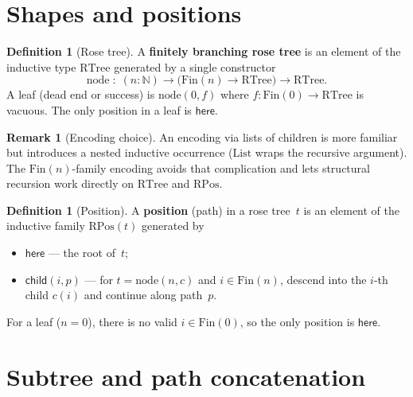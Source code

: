 \documentclass[11pt,a4paper]{article}
\theoremstyle{plain}
\theoremstyle{definition}
\newtheorem{definition}[theorem]{Definition}
\newtheorem{remark}[theorem]{Remark}
\newcommand{\RTree}{\mathrm{RTree}}
\newcommand{\RPos}{\mathrm{RPos}}
\newcommand{\Fin}{\mathrm{Fin}}
\begin{document}
\section{Shapes and positions}

\begin{definition}[Rose tree]\label{def:rtree}
A \textbf{finitely branching rose tree} is an element of the inductive
type $\RTree$ generated by a single constructor
\begin{equation}
  \mathrm{node} \;:\;
  (n : \mathbb{N}) \to
  \bigl(\Fin(n) \to \RTree\bigr) \to
  \RTree.
\end{equation}
A leaf (dead end or success) is $\mathrm{node}(0, f)$ where
$f : \Fin(0) \to \RTree$ is vacuous. The only position in a leaf is
$\mathsf{here}$.
\end{definition}

\begin{remark}[Encoding choice]
An encoding via lists of children is more familiar but introduces a
nested inductive occurrence ($\mathrm{List}$ wraps the recursive
argument). The $\Fin(n)$-family encoding avoids that complication and
lets structural recursion work directly on $\RTree$ and $\RPos$.
\end{remark}

\begin{definition}[Position]\label{def:rpos}
A \textbf{position} (path) in a rose tree~$t$ is an element of the
inductive family $\RPos(t)$ generated by
\begin{itemize}
  \item $\mathsf{here}$ --- the root of~$t$;
  \item $\mathsf{child}(i, p)$ --- for $t = \mathrm{node}(n, c)$ and
        $i \in \Fin(n)$, descend into the $i$-th child $c(i)$ and
        continue along path~$p$.
\end{itemize}
For a leaf ($n = 0$), there is no valid $i \in \Fin(0)$, so the only
position is $\mathsf{here}$.
\end{definition}

\section{Subtree and path concatenation}
\end{document}
